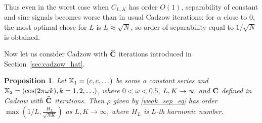 \documentclass[sii]{ipart}
\newtheorem{proposition}{Proposition}
\begin{document}
Thus even in the worst case when $C_{L,K}$ has order $O(1)$, separability of constant and sine signals becomes worse than in usual Cadzow iterations: for $\alpha$ close to 0, the most optimal chose for $L$ is $L \approx \sqrt{N}$, so order of separability equal to $1/\sqrt{N}$ is obtained.

Now let us consider Cadzow with $\widehat{\mathbf{C}}$ iterations introduced in Section~\ref{sec:cadzow_hat}.

\begin{proposition}
	\label{prop:separ2}
	Let $\mathbb{X}_1 = (c, c, \ldots)$ be some a constant series and $\mathbb{X}_2 = (\cos(2 \pi \omega k), k = 1, 2, \ldots)$, where $0<\omega <0.5$, $L,K\rightarrow \infty$ and $\mathbf{C}$ defined in Cadzow with $\widehat{\mathbf{C}}$ iterations.
	Then $\rho$ given by \eqref{weak_sep_eq} has order $\max \left(1/L, \frac{H_L}{\sqrt{NK}} \right)$ as $L, K \to \infty$, where $H_L$ is $L$-th harmonic number.
\end{proposition}
\end{document}
